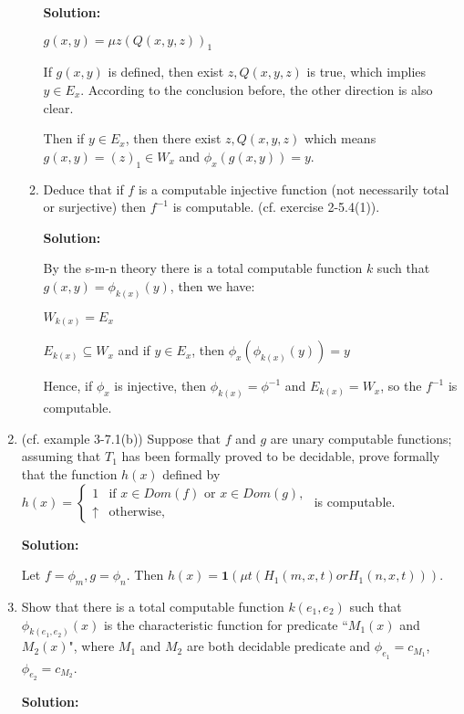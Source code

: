 \documentclass[12pt,a4paper]{article}
\theoremstyle{definition}
\numberwithin{equation}{section}
\numberwithin{figure}{section}
\begin{document}
\begin{enumerate}
\begin{enumerate}
\textbf{Solution:}

$g(x, y) = \mu z (Q(x,y,z))_1$

If $g(x,y)$ is defined, then exist $z, Q(x,y,z)$ is true, which implies $y \in E_x$. According to the conclusion before, the other direction is also clear.

Then if $y \in E_x$, then there exist $z, Q(x, y, z)$ which means $g(x, y) = (z)_1 ∈ W_x$ and $\phi_x(g(x, y)) = y$.




\item Deduce that if $f$ is a computable injective function (not necessarily total or surjective) then $f^{-1}$ is computable. (cf. exercise 2-5.4(1)).

\textbf{Solution:}

By the s-m-n theory there is a total computable function $k$ such that $g(x,y) = \phi_{k(x)}(y)$, then we have:

$W_{k(x)}=E_x$

$E_{k(x)} \subseteq W_x $ and if $y \in E_x$, then $\phi_x(\phi_{k(x)}(y)) = y$

Hence, if $\phi_x$ is injective, then $\phi_{k(x)}=\phi^{-1}$ and $E_{k(x)} = W_x$, so the $f^{-1}$ is computable.

\end{enumerate}




\item (cf. example 3-7.1(b)) Suppose that $f$ and $g$ are unary computable functions; assuming that $T_1$ has been formally proved to be decidable, prove formally that the function $h(x)$ defined by \\
    $h(x)=\left\{\begin{array}{ll}
    1& \mbox{if } x\in Dom(f) \mbox{ or } x\in Dom(g),\\
    \uparrow & \mbox{otherwise},
    \end{array}\right.$ is computable.

\textbf{Solution:}

Let $f = \phi_m, g = \phi_n$. Then $h(x) = \textbf{1}(\mu t(H_1(m,x,t) or H_1(n,x,t)))$.

\item Show that there is a total computable function $k(e_1, e_2)$ such that $\phi_{k(e_1,e_2)}(x)$ is the characteristic function for predicate ``$M_1(x)$ and $M_2(x)$", where $M_1$ and $M_2$ are both decidable predicate and $\phi_{e_1}=c_{M_1}$,  $\phi_{e_2}=c_{M_2}$.

\textbf{Solution:}


\end{enumerate}
\end{document}
